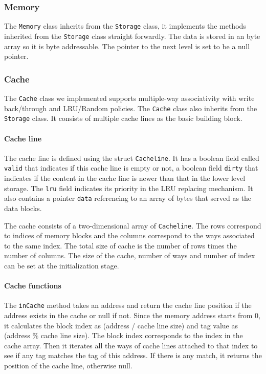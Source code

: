 \documentclass{sig-alternate}
\begin{document}
\subsubsection{Memory}
The \texttt{Memory} class inherits from the \texttt{Storage} class, it implements the methods inherited from the \texttt{Storage} class straight forwardly. The data is stored in an byte array so it is byte addressable. The pointer to the next level is set to be a null pointer. 

\subsubsection{Cache}
The \texttt{Cache} class we implemented supports multiple-way associativity with write back/through and LRU/Random policies. The \texttt{Cache} class also inherits from the \texttt{Storage} class. It consists of multiple cache lines as the basic building block.

\paragraph{Cache line}
 The cache line is defined using the struct \texttt{Cacheline}. It has a boolean field called \texttt{valid} that indicates if this cache line is empty or not, a boolean field \texttt{dirty} that indicates if the content in the cache line is newer than that in the lower level storage. The \texttt{lru} field indicates its priority in the LRU replacing mechanism. It also contains a pointer \texttt{data} referencing to an array of bytes that served as the data blocks.

The cache consists of a two-dimensional array of \texttt{Cacheline}. The rows correspond to indices of memory blocks and the columns correspond to the ways associated to the same index. The total size of cache is the number of rows times the number of columns. The size of the cache, number of ways and number of index can be set at the initialization stage.

\paragraph{Cache functions}
The \texttt{inCache} method takes an address and return the cache line position if the address exists in the cache or null if not. Since the memory address starts from 0, it calculates the block index as (address / cache line size) and tag value as (address $\%$ cache line size). The block index corresponds to the index in the cache array. Then it iterates all the ways of cache lines attached to that index to see if any tag matches the tag of this address. If there is any match, it returns the position of the cache line, otherwise null. 
\end{document}
